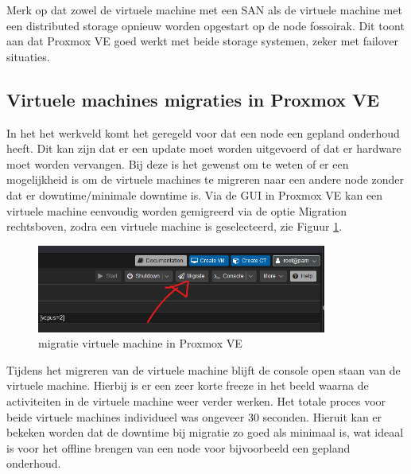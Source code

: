 Merk op dat zowel de virtuele machine met een SAN als de virtuele machine met een distributed storage opnieuw worden opgestart op de node fossoirak. Dit toont aan dat Proxmox VE goed werkt met beide storage systemen, zeker met failover situaties.

\subsection{Virtuele machines migraties in Proxmox VE}
In het het werkveld komt het geregeld voor dat een node een gepland onderhoud heeft. Dit kan zijn dat er een update moet worden uitgevoerd of dat er hardware moet worden vervangen.
Bij deze is het gewenst om te weten of er een mogelijkheid is om de virtuele machines te migreren naar een andere node zonder dat er downtime/minimale downtime is.
Via de GUI in Proxmox VE kan een virtuele machine eenvoudig worden gemigreerd via de optie Migration rechtsboven, zodra een virtuele machine is geselecteerd, zie Figuur \ref{fig:migratie-vm}.
\begin{figure}[H]
  \centering
  \includegraphics[width=0.85\textwidth]{../poc/vm-migratie-prox.png}
  \caption{migratie virtuele machine in Proxmox VE}
  \label{fig:migratie-vm}
\end{figure}
Tijdens het migreren van de virtuele machine blijft de console open staan van de virtuele machine. Hierbij is er een zeer korte freeze in het beeld waarna de activiteiten in de virtuele machine weer verder werken. Het totale proces voor beide virtuele machines individueel was ongeveer 30 seconden.
Hieruit kan er bekeken worden dat de downtime bij migratie zo goed als minimaal is, wat ideaal is voor het offline brengen van een node voor bijvoorbeeld een gepland onderhoud.

